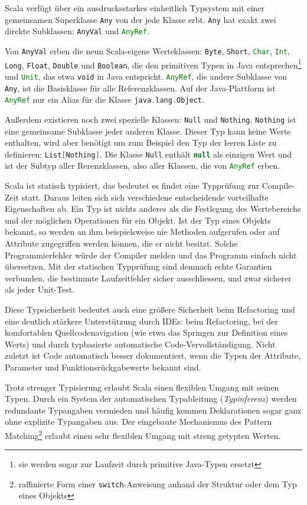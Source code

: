 \documentclass[a4paper, 12pt, hidelinks, listof=totoc, listoftables=totoc, bibliography=totoc]{scrreprt}
\newcommand{\code}[1]{\lstinline[language=Scala, style=inline]|#1|}
\newcommand{\scala}[1]{\lstinline[language=Scala, style=inline]|#1|}
\begin{document}
Scala verfügt über ein ausdrucksstarkes einheitlich Typsystem mit einer gemeinsamen Superklasse \scala{Any} von der jede Klasse erbt. \scala{Any} hat exakt zwei direkte Subklassen: \scala{AnyVal} und \scala{AnyRef}. 

Von \scala{AnyVal} erben die neun Scala-eigene Werteklassen: \scala{Byte}, \scala{Short}, \scala{Char}, \scala{Int}, \scala{Long}, \scala{Float}, \scala{Double} und \scala{Boolean}, die den primitiven Typen in Java entsprechen\footnote{sie werden sogar zur Laufzeit durch primitive Java-Typen ersetzt} und \scala{Unit}, das etwa \scala{void} in Java entspricht. \scala{AnyRef}, die andere Subklasse von \scala{Any}, ist die Basisklasse für alle Referenzklassen. Auf der Java-Plattform ist \scala{AnyRef} nur ein Alias für die Klasse \scala{java.lang.Object}. 

Außerdem existieren noch zwei spezielle Klassen: \scala{Null} und \scala{Nothing}. \scala{Nothing} ist eine gemeinsame Subklasse jeder anderen Klasse. Dieser Typ kann keine Werte enthalten, wird aber benötigt um zum Beispiel den Typ der leeren Liste zu definieren: \scala{List[Nothing]}. Die Klasse \scala{Null} enthält \scala{null} als einzigen Wert und ist der Subtyp aller Rerenzklassen, also aller Klassen, die von \scala{AnyRef} erben.

Scala ist statisch typisiert, das bedeutet es findet eine Typprüfung zur Compile-Zeit statt. Daraus leiten sich sich verschiedene entscheidende vorteilhafte Eigenschaften ab. Ein Typ ist nichts anderes als die Festlegung des Wertebereichs und der möglichen Operationen für ein Objekt. Ist der Typ eines Objekts bekannt, so werden an ihm beispielsweise nie Methoden aufgerufen oder auf Attribute zugegriffen werden können, die er nicht besitzt. Solche Programmierfehler würde der Compiler melden und das Programm einfach nicht übersetzen. Mit der statischen Typprüfung sind demnach echte Garantien verbunden, die bestimmte Laufzeitfehler sicher ausschliessen, und zwar sicherer als jeder Unit-Test.

Diese Typsicherheit bedeutet auch eine größere Sicherheit beim Refactoring und eine deutlich stärkere Unterstützung durch IDEs: beim Refactoring, bei der komfortablen Quellcodenavigation (wie etwa das Springen zur Definition eines Werts) und durch typbasierte automatische Code-Vervollständigung. Nicht zuletzt ist Code automatisch besser dokumentiert, wenn die Typen der Attribute, Parameter und Funktionsrückgabewerte bekannt sind.

Trotz strenger Typisierung erlaubt Scala einen flexiblen Umgang mit seinen Typen. Durch ein System der automatischen Typableitung (\emph{Typinferenz}) werden redundante Typangaben vermieden und häufig kommen Deklarationen sogar ganz ohne explizite Typangaben aus. Der eingebaute Mechanismus des Pattern Matching\footnote{raffinierte Form einer \code{switch}-Anweisung anhand der Struktur oder dem Typ eines Objekts} erlaubt einen sehr flexiblen Umgang mit streng getypten Werten.
\end{document}
